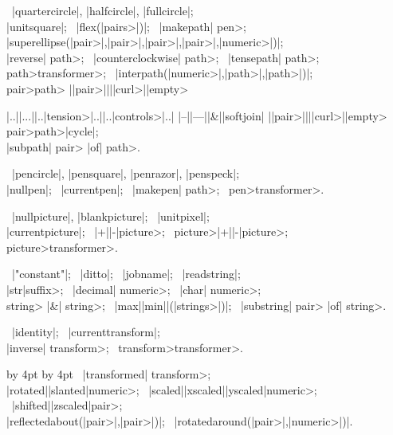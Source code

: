 \medbreak\textindent{} \
|quartercircle|, |halfcircle|, |fullcircle|;\\
|unitsquare|; \
|flex(|\<pairs>|)|; \
|makepath| \<pen>;\\
|superellipse(|\<pair>|,|\<pair>|,|\<pair>|,|\<pair>|,|\<numeric>|)|;\\
|reverse| \<path>; \
|counterclockwise| \<path>; \
|tensepath| \<path>;\\
\<path>\<transformer>; \
|interpath(|\<numeric>|,|\<path>|,|\<path>|)|;\\
\bb\<pair>\cr\<path>\ee
\bb|{|\<pair>|}|\cr|{|\<curl>|}|\cr\<empty>\ee
\bb\strut|..|\cr|...|\cr|..|\<tension>|..|\cr|..|\<controls>|..|\cr
 |--|\cr|---|\cr|&|\cr|softjoin|\ee
\bb|{|\<pair>|}|\cr|{|\<curl>|}|\cr\<empty>\ee
\bb\<pair>\cr\<path>\cr|cycle|\ee;\\
|subpath| \<pair> |of| \<path>.

\medbreak\textindent\bull {\it ^{Pen} things:\/} \
|pencircle|, |pensquare|, |penrazor|, |penspeck|;\\
|nullpen|; \ |currentpen|; \
|makepen| \<path>; \
\<pen>\<transformer>.

\medbreak\textindent{} \
|nullpicture|, |blankpicture|; \ |unitpixel|;\\
|currentpicture|; \
\bb|+|\cr|-|\ee\<picture>; \
\<picture>\bb|+|\cr|-|\ee\<picture>;\\
\<picture>\<transformer>.

\medbreak\textindent\bull {\it ^{String} things:\/} \
|"constant"|; \ |ditto|; \ |jobname|; \ |readstring|;\\
|str|\<suffix>; \
|decimal| \<numeric>; \
|char| \<numeric>;\\
\<string> |&| \<string>; \
\bb|max|\cr|min|\ee|(|\<strings>|)|; \
|substring| \<pair> |of| \<string>.

\medbreak\textindent{} \
|identity|; \ |currenttransform|;\\
|inverse| \<transform>; \
\<transform>\<transformer>.

\advance\lineskip by 4pt
\advance\medskipamount by 4pt
\medbreak\textindent{} \
|transformed| \<transform>;\\
\bb|rotated|\cr|slanted|\ee\<numeric>; \
\bb|scaled|\cr|xscaled|\cr|yscaled|\ee\<numeric>; \
\bb|shifted|\cr|zscaled|\ee\<pair>;\\
|reflectedabout(|\<pair>|,|\<pair>|)|; \
|rotatedaround(|\<pair>|,|\<numeric>|)|.

